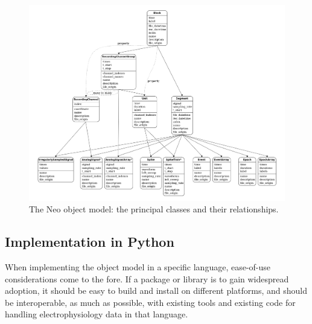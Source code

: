 \documentclass{frontiers}
\begin{document}
\begin{figure}
\centering
\includegraphics[width=1.0\textwidth]{figures/neo_graph_edit_lowres.png}
\caption{The Neo object model: the principal classes and their relationships.}\label{fig:relationships}
\end{figure}

\subsection{Implementation in Python}


When implementing the object model in a specific language, ease-of-use considerations come to the fore.
If a package or library is to gain widespread adoption, it should be easy to build and install on different platforms, and should be interoperable, as much as possible, with existing tools and existing code for handling electrophysiology data in that language.
\end{document}
